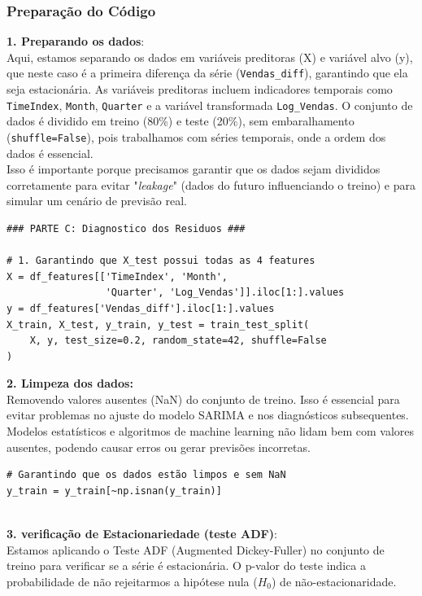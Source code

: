 \documentclass[a4paper, 12pt]{article}
\begin{document}
\subsubsection{Preparação do Código}

\textbf{1. Preparando os dados}:\\

Aqui, estamos separando os dados em variáveis preditoras (X) e variável alvo (y), que neste caso é a primeira diferença da série (\texttt{Vendas\_diff}), garantindo que ela seja estacionária. As variáveis preditoras incluem indicadores temporais como \texttt{TimeIndex}, \texttt{Month}, \texttt{Quarter} e a variável transformada \texttt{Log\_Vendas}. O conjunto de dados é dividido em treino (80\%) e teste (20\%), sem embaralhamento (\texttt{shuffle=False}), pois trabalhamos com séries temporais, onde a ordem dos dados é essencial.\\

Isso é importante porque precisamos garantir que os dados sejam divididos corretamente para evitar "\textit{leakage}" (dados do futuro influenciando o treino) e para simular um cenário de previsão real.

\begin{lstlisting}[style=python]
### PARTE C: Diagnostico dos Residuos ###

# 1. Garantindo que X_test possui todas as 4 features
X = df_features[['TimeIndex', 'Month',
                 'Quarter', 'Log_Vendas']].iloc[1:].values
y = df_features['Vendas_diff'].iloc[1:].values
X_train, X_test, y_train, y_test = train_test_split(
    X, y, test_size=0.2, random_state=42, shuffle=False
)
\end{lstlisting}

\textbf{2. Limpeza dos dados:}\\
Removendo valores ausentes (NaN) do conjunto de treino. Isso é essencial para evitar problemas no ajuste do modelo SARIMA e nos diagnósticos subsequentes. Modelos estatísticos e algoritmos de machine learning não lidam bem com valores ausentes, podendo causar erros ou gerar previsões incorretas.

\begin{lstlisting}[style=python]
    # Garantindo que os dados estão limpos e sem NaN
y_train = y_train[~np.isnan(y_train)]
    
\end{lstlisting}

\textbf{3. verificação de Estacionariedade (teste ADF)}:\\
Estamos aplicando o Teste ADF (Augmented Dickey-Fuller) no conjunto de treino para verificar se a série é estacionária. O p-valor do teste indica a probabilidade de não rejeitarmos a hipótese nula ($H_0$) de não-estacionaridade.\\
\end{document}
